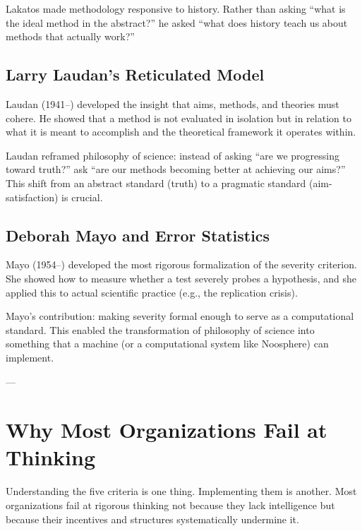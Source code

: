 \documentclass[11pt,letterpaper]{article}
\begin{document}
Lakatos made methodology responsive to history. Rather than asking ``what is the ideal method in the abstract?'' he asked ``what does history teach us about methods that actually work?''

\subsection*{Larry Laudan's Reticulated Model}

Laudan (1941--) developed the insight that aims, methods, and theories must cohere. He showed that a method is not evaluated in isolation but in relation to what it is meant to accomplish and the theoretical framework it operates within.

Laudan reframed philosophy of science: instead of asking ``are we progressing toward truth?'' ask ``are our methods becoming better at achieving our aims?'' This shift from an abstract standard (truth) to a pragmatic standard (aim-satisfaction) is crucial.

\subsection*{Deborah Mayo and Error Statistics}

Mayo (1954--) developed the most rigorous formalization of the severity criterion. She showed how to measure whether a test severely probes a hypothesis, and she applied this to actual scientific practice (e.g., the replication crisis).

Mayo's contribution: making severity formal enough to serve as a computational standard. This enabled the transformation of philosophy of science into something that a machine (or a computational system like Noosphere) can implement.

---

\newpage


\section{Why Most Organizations Fail at Thinking}

Understanding the five criteria is one thing. Implementing them is another. Most organizations fail at rigorous thinking not because they lack intelligence but because their incentives and structures systematically undermine it.
\end{document}
